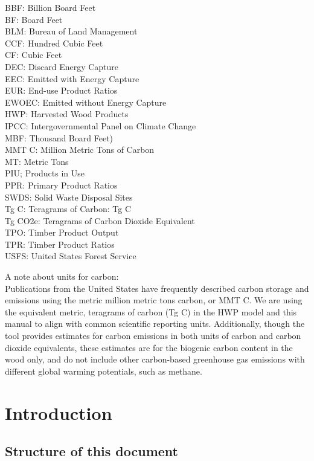 \documentclass[
  openany]{book}
\begin{document}
BBF: Billion Board Feet\\
BF: Board Feet\\
BLM: Bureau of Land Management\\
CCF: Hundred Cubic Feet\\
CF: Cubic Feet\\
DEC: Discard Energy Capture\\
EEC: Emitted with Energy Capture\\
EUR: End-use Product Ratios\\
EWOEC: Emitted without Energy Capture\\
HWP: Harvested Wood Products\\
IPCC: Intergovernmental Panel on Climate Change\\
MBF: Thousand Board Feet)\\
MMT C: Million Metric Tons of Carbon\\
MT: Metric Tons\\
PIU; Products in Use\\
PPR: Primary Product Ratios\\
SWDS: Solid Waste Disposal Sites\\
Tg C: Teragrams of Carbon: Tg C\\
Tg CO2e: Teragrams of Carbon Dioxide Equivalent\\
TPO: Timber Product Output\\
TPR: Timber Product Ratios\\
USFS: United States Forest Service

A note about units for carbon:\\
Publications from the United States have frequently described carbon storage and emissions using the metric million metric tons carbon, or MMT C. We are using the equivalent metric, teragrams of carbon (Tg C) in the HWP model and this manual to align with common scientific reporting units. Additionally, though the tool provides estimates for carbon emissions in both units of carbon and carbon dioxide equivalents, these estimates are for the biogenic carbon content in the wood only, and do not include other carbon-based greenhouse gas emissions with different global warming potentials, such as methane.

\hypertarget{int}{%
\chapter{Introduction}\label{int}}

\hypertarget{int-struc}{%
\section{Structure of this document}\label{int-struc}}
\end{document}

